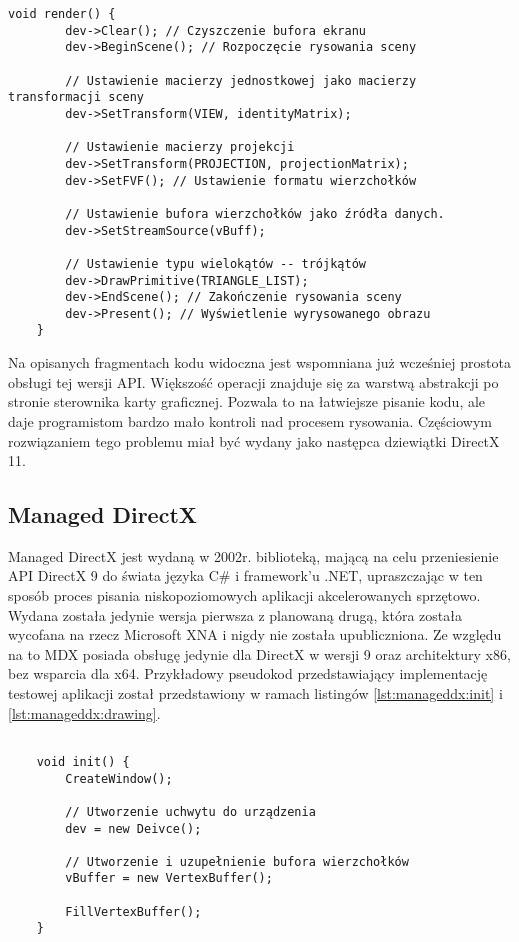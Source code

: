 \begin{lstlisting}[caption={Pseudokod rysowania Direct3D 9 (oryginalna treść)}, label={lst:d3d9:render}]
	void render() {
		dev->Clear(); // Czyszczenie bufora ekranu
		dev->BeginScene(); // Rozpoczęcie rysowania sceny
		
		// Ustawienie macierzy jednostkowej jako macierzy transformacji sceny		
		dev->SetTransform(VIEW, identityMatrix);
		
		// Ustawienie macierzy projekcji
		dev->SetTransform(PROJECTION, projectionMatrix);
		dev->SetFVF(); // Ustawienie formatu wierzchołków
		
		// Ustawienie bufora wierzchołków jako źródła danych.
		dev->SetStreamSource(vBuff);
		
		// Ustawienie typu wielokątów -- trójkątów		
		dev->DrawPrimitive(TRIANGLE_LIST);	
		dev->EndScene(); // Zakończenie rysowania sceny		
		dev->Present(); // Wyświetlenie wyrysowanego obrazu
	}
\end{lstlisting}

Na opisanych fragmentach kodu widoczna jest wspomniana już wcześniej
prostota obsługi tej wersji API. Większość operacji znajduje się za
warstwą abstrakcji po stronie sterownika karty graficznej. Pozwala to na
łatwiejsze pisanie kodu, ale daje programistom bardzo mało kontroli nad
procesem rysowania. Częściowym rozwiązaniem tego problemu miał być
wydany jako następca dziewiątki DirectX 11.

\subsection{Managed DirectX}

Managed DirectX jest wydaną w 2002r. biblioteką, mającą na celu
przeniesienie API DirectX 9 do świata języka C\# i framework'u .NET,
upraszczając w ten sposób proces pisania niskopoziomowych aplikacji
akcelerowanych sprzętowo. Wydana została jedynie wersja pierwsza z planowaną drugą, która została
wycofana na rzecz Microsoft XNA i nigdy nie została upubliczniona. Ze
względu na to MDX posiada obsługę jedynie dla DirectX w wersji 9 oraz
architektury x86, bez wsparcia dla x64. Przykładowy pseudokod przedstawiający implementację testowej aplikacji
został przedstawiony w ramach listingów \ref{lst:manageddx:init} i \ref{lst:manageddx:drawing}.

\begin{lstlisting}[caption={Funkcja inicjalizacji przy pomocy Managed DirectX}, label={lst:manageddx:init}]
	
	void init() {
		CreateWindow();
		
		// Utworzenie uchwytu do urządzenia
		dev = new Deivce();
		
		// Utworzenie i uzupełnienie bufora wierzchołków
		vBuffer = new VertexBuffer();
		
		FillVertexBuffer();
	}
	
\end{lstlisting}

